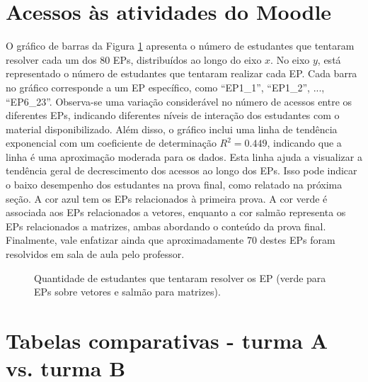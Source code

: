 
\section{Acessos às atividades do Moodle}

O gráfico de barras da Figura \ref{fig:ApeA_Acessos_EPs} apresenta o número de estudantes que tentaram resolver cada um dos 80 EPs, distribuídos ao longo do eixo \( x \). No eixo \( y \), está representado o número de estudantes que tentaram realizar cada EP. Cada barra no gráfico corresponde a um EP específico, como ``EP1\_1'', ``EP1\_2'', ..., ``EP6\_23''. Observa-se uma variação considerável no número de acessos entre os diferentes EPs, indicando diferentes níveis de interação dos estudantes com o material disponibilizado. Além disso, o gráfico inclui uma linha de tendência exponencial com um coeficiente de determinação \( R^2=0.449 \), indicando que a linha é uma aproximação moderada para os dados. Esta linha ajuda a visualizar a tendência geral de decrescimento dos acessos ao longo dos EPs. Isso pode indicar o baixo desempenho dos estudantes na prova final, como relatado na próxima seção. A cor azul tem os EPs relacionados à primeira prova. A cor verde é associada aos EPs relacionados a vetores, enquanto a cor salmão representa os EPs relacionados a matrizes, ambas abordando o conteúdo da prova final. Finalmente, vale enfatizar ainda que aproximadamente 70 destes EPs foram resolvidos em sala de aula pelo professor.

\begin{figure}[!ht]
    \centering
    \caption{Quantidade de estudantes que tentaram resolver os EP (verde para EPs sobre vetores e salmão para matrizes).}
    \label{fig:ApeA_Acessos_EPs}
\end{figure}




\section{Tabelas comparativas - turma A vs. turma B}

